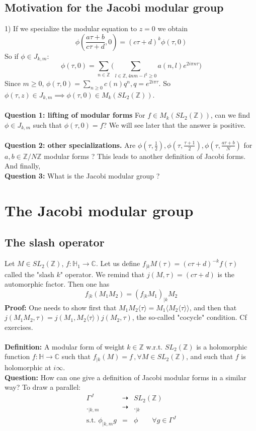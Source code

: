 \documentclass[10pt,a4paper]{article}
\begin{document}
\subsection{Motivation for the Jacobi modular group}
1) If we specialize the modular equation to $z=0$ we obtain
\[\phi(\frac{a\tau+b}{c\tau+d},0)=(c\tau+d)^k\phi(\tau,0)\]
So if $\phi\in J_{k,m}$:
\[\phi(\tau,0)=\sum_{n\in\mathbb{Z}}
\Big(\sum_{l\in\mathbb{Z}, 4nm-l^2\geq0}a(n,l)e^{2i\pi n\tau}\Big)\]
Since $m\geq0$, $\phi(\tau,0)=\sum_{n\geq0}c(n)q^n,q=e^{2i\pi\tau}$. So $\phi(\tau,z)\in J_{k,m}\implies\phi(\tau,0)\in M_k\left(SL_2(\mathbb{Z})\right)$.\\
\\
\textbf{Question 1: lifting of modular forms} 
For $f\in M_k(SL_2(\mathbb{Z}))$, can we find $\phi\in J_{k,m}$ such that $\phi(\tau,0)=f$? We will see later that the answer is positive.\\
\\
\textbf{Question 2: other specializations.} Are $\phi(\tau,\frac{1}{2}),\phi(\tau,\frac{\tau+1}{2}),\phi(\tau,\frac{a\tau+b}{N})$ for $a, b \in \mathbb{Z}/N\mathbb{Z}$ modular forms ?
This leads to another definition of Jacobi forms. 
\\And finally, 
\\
\textbf{Question 3:} What is the Jacobi modular group ?\\
\section{The Jacobi modular group}
\subsection{The slash operator}
Let $M\in SL_2(\mathbb{Z})$, $f:\mathbb{H}_1\rightarrow\mathbb{C}$. Let us define $f_{|k}M(\tau)=(c\tau+d)^{-k}f(\tau)$ called the "slash $k$" operator. We remind that $j(M,\tau)=(c\tau+d)$ is the automorphic factor. Then one has
\[f_{|k}(M_1M_2)=(f_{|k}M_1)_{|k}M_2\]
\textbf{Proof:} One needs to show first that $M_1M_2\langle\tau\rangle=M_1\langle M_2\langle\tau\rangle\rangle$, and then that $j(M_1M_2,\tau)=j(M_1,M_2\langle\tau\rangle)j(M_2,\tau)$, the so-called "cocycle" condition. Cf exercises.\\
\\
\textbf{Definition:} A modular form of weight $k\in\mathbb{Z}$ w.r.t. $SL_2(\mathbb{Z})$ is a holomorphic function $f:\mathbb{H}\rightarrow\mathbb{C}$ such that $f_{|k}(M)=f\,,\forall	M\in SL_2(\mathbb{Z})$, and such that $f$ is holomorphic at $i\infty$.\\
\textbf{Question:} How can one give a definition of Jacobi modular forms in a similar way? To draw a parallel:
\begin{eqnarray*}
\Gamma^J&\dashrightarrow& SL_2(\mathbb{Z})\\
._{|k,m}&\dashrightarrow& ._{|k}\\
\textrm{s.t. }\phi_{|k,m}g&=&\phi\qquad\forall g\in\Gamma^J
\end{eqnarray*}
\end{document}
